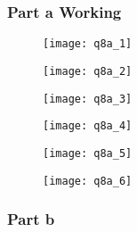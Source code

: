 			\subsubsection{Part a Working}
			\begin{figure}[position = here]
				\begin{centering}
					\texttt{[image: q8a\_1]}\\
				\end{centering}
			\end{figure}
			\pagebreak
			\begin{figure}[position = here]
				\begin{centering}
					\texttt{[image: q8a\_2]}\\
				\end{centering}
			\end{figure}
			\pagebreak
			\begin{figure}[position = here]
				\begin{centering}
					\texttt{[image: q8a\_3]}\\
				\end{centering}
			\end{figure}
			\pagebreak
			\begin{figure}[position = here]
				\begin{centering}
					\texttt{[image: q8a\_4]}\\
				\end{centering}
			\end{figure}
			\pagebreak
			\begin{figure}[position = here]
				\begin{centering}
					\texttt{[image: q8a\_5]}\\
				\end{centering}
			\end{figure}
			\pagebreak
			\begin{figure}[position = here]
				\begin{centering}
					\texttt{[image: q8a\_6]}\\
				\end{centering}
			\end{figure}
			\pagebreak
			\subsubsection{Part b}
			